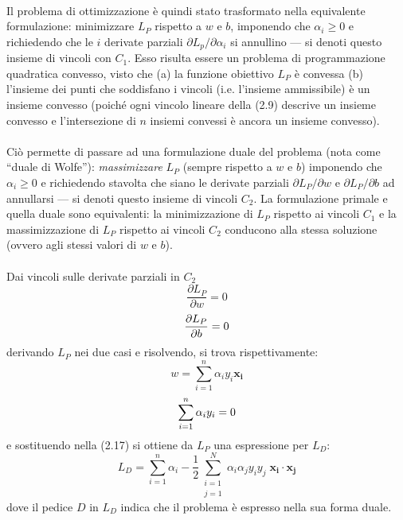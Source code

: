 \paragraph{}
Il problema di ottimizzazione è quindi stato trasformato nella equivalente formulazione: minimizzare $L_P$ rispetto a $w$ e $b$, imponendo che $\alpha_i \geq 0$ e richiedendo che le $i$ derivate parziali $\partial L_p / \partial \alpha_i$ si annullino --- si denoti questo insieme di vincoli con $C_1$. Esso risulta essere un problema di programmazione quadratica convesso, visto che (a) la funzione obiettivo $L_P$ è convessa (b) l'insieme dei punti che soddisfano i vincoli (i.e. l'insieme ammissibile) è un insieme convesso (poiché ogni vincolo lineare della (2.9) descrive un insieme convesso e l'intersezione di $n$ insiemi convessi è ancora un insieme convesso).

\paragraph{}
Ciò permette di passare ad una formulazione duale del problema (nota come ``duale di Wolfe''): \textit{massimizzare} $L_P$ (sempre rispetto a $w$ e $b$) imponendo che $\alpha_i \geq 0$ e richiedendo stavolta che siano le derivate parziali $\partial L_P / \partial w$ e $\partial L_P / \partial b$ ad annullarsi --- si denoti questo insieme di vincoli $C_2$.
La formulazione primale e quella duale sono equivalenti: la minimizzazione di $L_P$ rispetto ai vincoli $C_1$ e la massimizzazione di $L_P$ rispetto ai vincoli $C_2$ conducono alla stessa soluzione (ovvero agli stessi valori di $w$ e $b$).

\paragraph{}
Dai vincoli sulle derivate parziali in $C_2$
\begin{equation}	
	\frac{\partial L_P}{\partial w} = 0
\end{equation}
\begin{equation}	
	\frac{\partial L_P}{\partial b} = 0
	\vspace{2mm}
\end{equation}
derivando $L_P$ nei due casi e risolvendo, si trova rispettivamente:
\begin{equation}		
	w = \sum\limits_{i = 1}^{n} {\alpha_i y_i \boldsymbol{x_i}}
\end{equation}
\begin{equation}
	\sum\limits_{i = 1}^{n} {\alpha_i y_i} = 0
\vspace{2mm}
\end{equation}
e sostituendo nella (2.17) si ottiene da $L_P$ una espressione per $L_D$:
\begin{equation}
	L_D = \sum\limits_{i = 1}^{n} {\alpha_i} - \frac{1}{2} \sum\limits_{\substack{i = 1 \\ j = 1}}^{N} {\alpha_i \alpha_j y_i y_j \; \boldsymbol{x_i} \cdot \boldsymbol{x_j}}
\end{equation} 
dove il pedice $D$ in $L_D$ indica che il problema è espresso nella sua forma duale.

